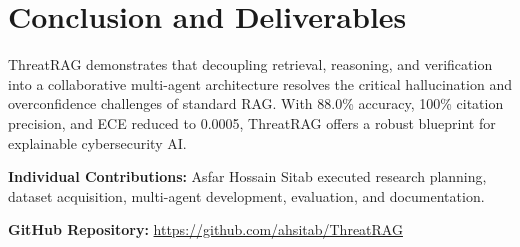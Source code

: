 \documentclass[conference]{IEEEtran}
\begin{document}
\section{Conclusion and Deliverables}
ThreatRAG demonstrates that decoupling retrieval, reasoning, and verification into a collaborative multi-agent architecture resolves the critical hallucination and overconfidence challenges of standard RAG. With 88.0\% accuracy, 100\% citation precision, and ECE reduced to 0.0005, ThreatRAG offers a robust blueprint for explainable cybersecurity AI.

\textbf{Individual Contributions:} Asfar Hossain Sitab executed research planning, dataset acquisition, multi-agent development, evaluation, and documentation.

\textbf{GitHub Repository:} \url{https://github.com/ahsitab/ThreatRAG}



\end{document}
